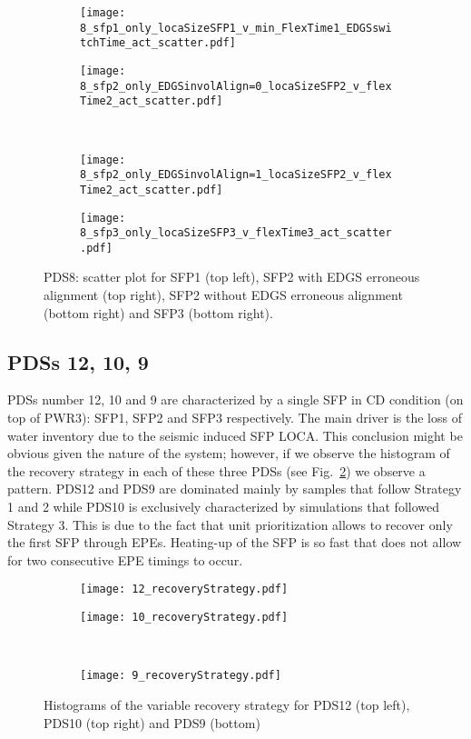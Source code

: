 \begin{figure}
  \begin{subfigure}{.5\linewidth}
    \centering
    \texttt{[image: 8\_sfp1\_only\_locaSizeSFP1\_v\_min\_FlexTime1\_EDGSswitchTime\_act\_scatter.pdf]}
  \end{subfigure}%
  \begin{subfigure}{.5\linewidth}
    \centering
    \texttt{[image: 8\_sfp2\_only\_EDGSinvolAlign=0\_locaSizeSFP2\_v\_flexTime2\_act\_scatter.pdf]}
  \end{subfigure}\\[1ex]
  \begin{subfigure}{.5\linewidth}
    \centering
    \texttt{[image: 8\_sfp2\_only\_EDGSinvolAlign=1\_locaSizeSFP2\_v\_flexTime2\_act\_scatter.pdf]}
  \end{subfigure}
  \begin{subfigure}{.5\linewidth}
    \centering
    \texttt{[image: 8\_sfp3\_only\_locaSizeSFP3\_v\_flexTime3\_act\_scatter.pdf]}
  \end{subfigure}
  \caption{PDS8: scatter plot for SFP1 (top left), SFP2 with EDGS erroneous alignment (top right), 
           SFP2 without EDGS erroneous alignment (bottom right) and SFP3 (bottom right).}
  \label{fig:scatterPDS8}
\end{figure}  

\subsection{PDSs 12, 10, 9}
PDSs number 12, 10 and 9 are characterized by a single SFP in CD condition (on top of PWR3): SFP1, 
SFP2 and SFP3 respectively. The main driver is the loss of water inventory due to the seismic induced
SFP LOCA.
This conclusion might be obvious given the nature of the system; however, if we observe the 
histogram of the recovery strategy in each of these three PDSs 
(see Fig.~\ref{fig:histPDS_12_10_9_recoveryStrategy}) we observe a pattern.
PDS12 and PDS9 are dominated mainly by samples that follow Strategy 1 and 2 while PDS10 is 
exclusively characterized by simulations that followed Strategy 3.
This is due to the fact that unit prioritization allows to recover only the first SFP through EPEs. 
Heating-up of the SFP is so fast that does not allow for two consecutive 
EPE timings to occur.

\begin{figure}
  \begin{subfigure}{.5\linewidth}
    \centering
    \texttt{[image: 12\_recoveryStrategy.pdf]}
  \end{subfigure}%
  \begin{subfigure}{.5\linewidth}
    \centering
    \texttt{[image: 10\_recoveryStrategy.pdf]}
  \end{subfigure}\\[1ex]
  \begin{subfigure}{\linewidth}
    \centering
    \texttt{[image: 9\_recoveryStrategy.pdf]}
  \end{subfigure}
  \caption{Histograms of the variable recovery strategy for PDS12 (top left), PDS10 (top right) and PDS9 (bottom)}
  \label{fig:histPDS_12_10_9_recoveryStrategy}
\end{figure}


